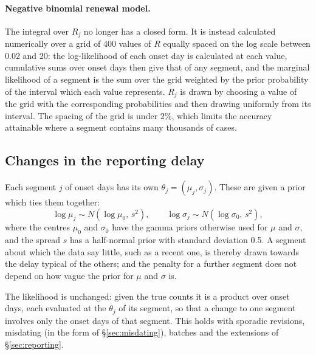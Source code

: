 \documentclass[11pt,a4paper]{article}
\begin{document}
\paragraph{Negative binomial renewal model.} The integral over $R_j$ no longer
has a closed form. It is instead calculated numerically over a grid of 400
values of $R$ equally spaced on the log scale between 0.02 and 20: the
log-likelihood of each onset day is calculated at each value, cumulative sums
over onset days then give that of any segment, and the marginal likelihood of
a segment is the sum over the grid weighted by the prior probability of the
interval which each value represents. $R_j$ is drawn by choosing a value of the
grid with the corresponding probabilities and then drawing uniformly from its
interval. The spacing of the grid is under 2\%, which limits the accuracy
attainable where a segment contains many thousands of cases.

\subsection{Changes in the reporting delay}

Each segment $j$ of onset days has its own $\theta_j=(\mu_j,\sigma_j)$. These
are given a prior which ties them together:
\begin{equation}\label{eq:delayhierarchy}
\log\mu_j\sim N(\log\mu_0,\,s^2),\qquad \log\sigma_j\sim N(\log\sigma_0,\,s^2),
\end{equation}
where the centres $\mu_0$ and $\sigma_0$ have the gamma priors otherwise used
for $\mu$ and $\sigma$, and the spread $s$ has a half-normal prior with
standard deviation 0.5. A segment about which the data say little, such as a
recent one, is thereby drawn towards the delay typical of the others; and the
penalty for a further segment does not depend on how vague the prior for
$\mu$ and $\sigma$ is.

The likelihood is unchanged: given the true counts it is a product over onset
days, each evaluated at the $\theta_j$ of its segment, so that a change to one
segment involves only the onset days of that segment. This holds with sporadic
revisions, misdating (in the form of \S\ref{sec:misdating}), batches and the
extensions of \S\ref{sec:reporting}.
\end{document}
